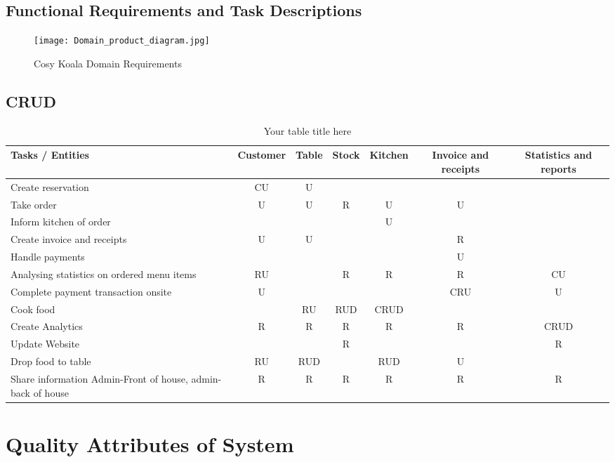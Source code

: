 \documentclass{article}
\begin{document}
\subsection{Functional Requirements and Task Descriptions}
\begin{figure}[!ht]
    \centering
    \texttt{[image: Domain\_product\_diagram.jpg]}
    \caption{Cosy Koala Domain Requirements}
    \label{fig:Domain_Product}
\end{figure}

\clearpage
\subsection{CRUD}

\begin{table}[h!]
  \centering
  \begin{tabular}{|l|c|c|c|c|c|c|}
    \hline
    \textbf{Tasks / Entities} & \textbf{Customer} & \textbf{Table} & \textbf{Stock} & \textbf{Kitchen} & \textbf{Invoice and receipts} & \textbf{Statistics and reports} \\
    \hline
    Create reservation & CU & U & & & & \\
    \hline
    Take order & U & U & R & U & U & \\
    \hline
    Inform kitchen of order & & & & U & & \\
    \hline
    Create invoice and receipts & U & U & & & R & \\
    \hline
    Handle payments & & & & & U & \\
    \hline
    Analysing statistics on ordered menu items & RU & & R & R & R & CU \\
    \hline
    Complete payment transaction onsite & U & & & & CRU & U \\
    \hline
    Cook food & & RU & RUD & CRUD & & \\
    \hline
    Create Analytics & R & R & R & R & R & CRUD \\
    \hline
    Update Website & & & R & & & R \\
    \hline
    Drop food to table & RU & RUD & & RUD & U & \\
    \hline
    Share information Admin-Front of house, admin-back of house & R & R & R & R & R & R \\
    \hline
  \end{tabular}
  \caption{Your table title here}
\end{table}

\clearpage
\section{Quality Attributes of System}
\end{document}
